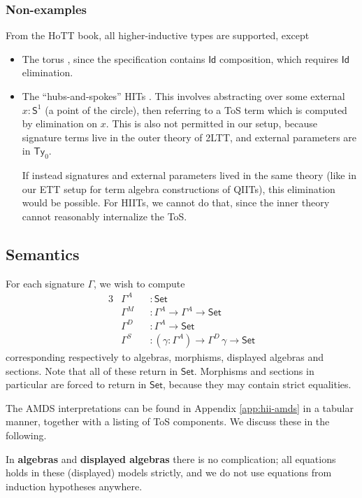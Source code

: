 \documentclass[12pt,a4paper,twoside,openany]{book}
\theoremstyle{remark}
\theoremstyle{definition}
\theoremstyle{theorem}
\newcommand{\ms}[1]{\mathsf{#1}}
\newcommand{\Ty}{\mathsf{Ty}}
\newcommand{\Id}{\mathsf{Id}}
\newcommand{\Set}{\mathsf{Set}}
\begin{document}
\subsubsection{Non-examples}
From the HoTT book, all higher-inductive types are supported, except
\begin{itemize}
\item
  The torus \cite[Section~6.6]{hottbook}, since the specification contains $\Id$
  composition, which requires $\Id$ elimination.
\item
  The ``hubs-and-spokes'' HITs \cite[Section~6.7]{hottbook}.  This involves
  abstracting over some external $x : \ms{S}^1$ (a point of the circle), then
  referring to a ToS term which is computed by elimination on $x$. This is also
  not permitted in our setup, because signature terms live in the outer theory
  of 2LTT, and external parameters are in $\Ty_0$.

  If instead signatures and external parameters lived in the same theory (like in
  our ETT setup for term algebra constructions of QIITs), this elimination would
  be possible. For HIITs, we cannot do that, since the inner theory cannot
  reasonably internalize the ToS.
\end{itemize}

\subsection{Semantics}

For each signature $\Gamma$, we wish to compute
\begin{alignat*}{3}
  &\Gamma^A &&: \Set\\
  &\Gamma^M &&: \Gamma^A \to \Gamma^A \to \Set\\
  &\Gamma^D &&: \Gamma^A \to \Set\\
  &\Gamma^S &&: (\gamma : \Gamma^A) \to \Gamma^D\,\gamma \to \Set
\end{alignat*}
corresponding respectively to algebras, morphisms, displayed algebras and
sections. Note that all of these return in $\Set$. Morphisms and sections in
particular are forced to return in $\Set$, because they may contain strict
equalities.

The AMDS interpretations can be found in Appendix \ref{app:hii-amds} in a
tabular manner, together with a listing of ToS components. We discuss these
in the following.

In \textbf{algebras} and \textbf{displayed algebras} there is no
complication; all equations holds in these (displayed) models strictly, and we
do not use equations from induction hypotheses anywhere.
\end{document}
